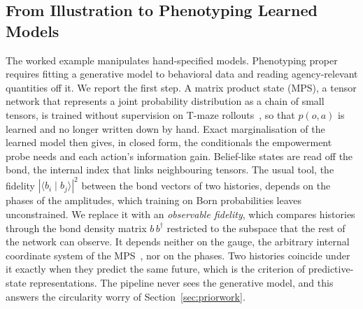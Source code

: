 \documentclass[letterpaper]{article} %
\theoremstyle{definition}
\begin{document}
\subsection{From Illustration to Phenotyping Learned Models}\label{sec:learned}
The worked example manipulates hand-specified models. Phenotyping proper requires fitting a generative model to behavioral data and reading agency-relevant quantities off it. We report the first step. A matrix product state (MPS), a tensor network that represents a joint probability distribution as a chain of small tensors, is trained without supervision on T-maze rollouts~\citep{wauthierLearningGenerative2022}, so that $p(o,a)$ is learned and no longer written down by hand. Exact marginalisation of the learned model then gives, in closed form, the conditionals the empowerment probe needs and each action's information gain. Belief-like states are read off the bond, the internal index that links neighbouring tensors. The usual tool, the fidelity $|\langle b_i \mid b_j \rangle|^2$ between the bond vectors of two histories, depends on the phases of the amplitudes, which training on Born probabilities leaves unconstrained. We replace it with an \emph{observable fidelity}, which compares histories through the bond density matrix $b\,b^\dagger$ restricted to the subspace that the rest of the network can observe. It depends neither on the gauge, the arbitrary internal coordinate system of the MPS~\citep{aizpuruaTensorExplainable2024,ranTensorNetworkInterpretable2023}, nor on the phases. Two histories coincide under it exactly when they predict the same future, which is the criterion of predictive-state representations. The pipeline never sees the generative model, and this answers the circularity worry of Section~\ref{sec:priorwork}.
\end{document}
